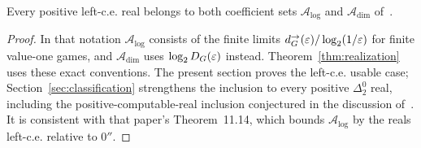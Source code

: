 \begin{corollary}\label{cor:coefficient-inclusion}
Every positive left-c.e. real belongs to both coefficient sets $\mathcal A_{\log}$ and $\mathcal A_{\dim}$ of~\cite[Section~11.6]{DM-precision}.
\end{corollary}
\begin{proof}
In that notation $\mathcal A_{\log}$ consists of the finite limits $d^\to_G(\varepsilon)/\log_2(1/\varepsilon)$ for finite value-one games, and $\mathcal A_{\dim}$ uses $\log_2D_G(\varepsilon)$ instead. Theorem~\ref{thm:realization} uses these exact conventions. The present section proves the left-c.e. usable case; Section~\ref{sec:classification} strengthens the inclusion to every positive $\Delta^0_2$ real, including the positive-computable-real inclusion conjectured in the discussion of~\cite[Problem~18.3(i)]{DM-precision}. It is consistent with that paper's Theorem~11.14, which bounds $\mathcal A_{\log}$ by the reals left-c.e. relative to $0''$.
\end{proof}

